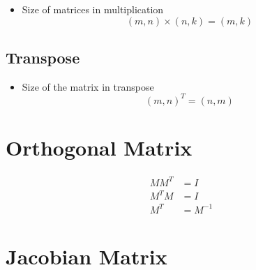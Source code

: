     \begin{itemize}
      \item Size of matrices in multiplication
      \begin{equation}
        \left( m, n \right) \times \left( n, k \right) = \left( m, k \right)
      \end{equation}
    \end{itemize}

  \subsection{Transpose}

    \begin{itemize}
      \item Size of the matrix in transpose
      \begin{equation}
        \left( m, n \right)^{T} = \left( n, m \right)
      \end{equation}
    \end{itemize}

\section{Orthogonal Matrix}

    \begin{align}
      M M^{T} &= I \\
      M^{T} M &= I \\
      M^{T} &= M^{-1}
    \end{align}

\section{Jacobian Matrix}
